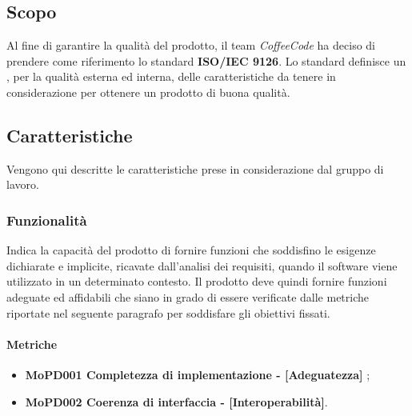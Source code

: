 \documentclass[../piano-di-qualifica.tex]{subfiles}
\begin{document}
\subsection{Scopo}%
\label{sec:scopo}
Al fine di garantire la qualità del prodotto, il team \emph{CoffeeCode} ha deciso di prendere come riferimento lo standard \textbf{ISO/IEC 9126}.
Lo standard definisce un , per la qualità esterna ed interna, delle caratteristiche da tenere in considerazione per ottenere un prodotto di buona qualità.

\subsection{Caratteristiche}%
\label{sub:caratteristiche}
Vengono qui descritte le caratteristiche prese in considerazione dal gruppo di lavoro.

\subsubsection{Funzionalità}%
\label{sub:funzionalita}
Indica la capacità del prodotto di fornire funzioni che soddisfino le esigenze dichiarate e implicite, ricavate dall'analisi dei requisiti, quando il software viene utilizzato in un determinato contesto.
Il prodotto deve quindi fornire funzioni adeguate ed affidabili che siano in grado di essere verificate dalle metriche riportate nel seguente paragrafo per soddisfare gli obiettivi fissati.

\paragraph{Metriche}
\label{sub:metriche}
\begin{itemize}
    \item \textbf{MoPD001 Completezza di implementazione - [Adeguatezza]} ;
    \item \textbf{MoPD002 Coerenza di interfaccia - [Interoperabilità]}.
\end{itemize}
\end{document}
